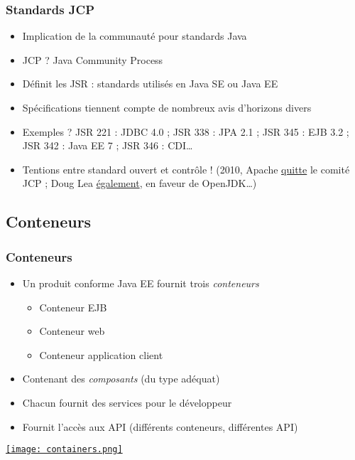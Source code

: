 \documentclass[english, french]{beamer}
\begin{document}
\begin{frame}
	\frametitle{Standards JCP}
	\begin{itemize}
		\item Implication de \og{}la communauté\fg{} pour standards Java
		\item JCP ? \pause Java Community Process \pause
		\item Définit les JSR : standards utilisés en Java SE ou Java EE
		\item Spécifications tiennent compte de nombreux avis d’horizons divers
		\item Exemples ? \pause JSR 221 : JDBC 4.0 ; JSR 338 : JPA 2.1 ; JSR 345 : EJB 3.2 ; JSR 342 : Java EE 7 ; JSR 346 : CDI… \pause
		\item Tentions entre standard ouvert et contrôle ! (2010, Apache \href{https://blogs.apache.org/foundation/entry/the_asf_resigns_from_the}{quitte} le comité JCP ; Doug Lea \href{http://gee.cs.oswego.edu/dl/html/jcp22oct10.html}{également}, en faveur de OpenJDK…)
	\end{itemize}
\end{frame}

\subsection{Conteneurs}
\begin{frame}
	\frametitle{Conteneurs}
	\begin{itemize}
		\item Un produit conforme Java EE fournit trois \emph{conteneurs}
		\begin{itemize}
			\item Conteneur EJB
			\item Conteneur web
			\item Conteneur application client
		\end{itemize}
		\item Contenant des \emph{composants} (du type adéquat)
		\item Chacun fournit des services pour le développeur
		\item Fournit l’accès aux API (différents conteneurs, différentes API)
	\end{itemize}
	\href{https://docs.oracle.com/javaee/7/tutorial/overview007.htm}{\texttt{[image: containers.png]}}
\end{frame}
\end{document}
